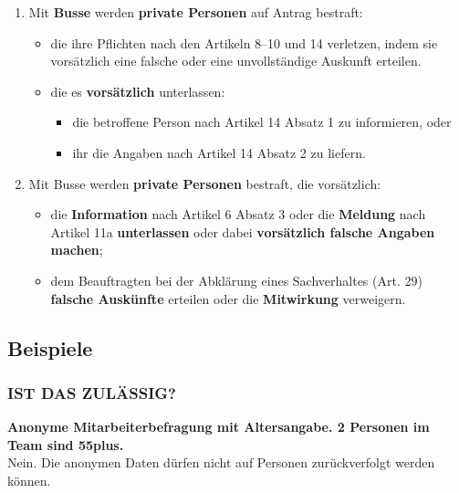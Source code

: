 \begin{enumerate}
\def\labelenumi{\arabic{enumi}.}
\tightlist
\item
  Mit \textbf{Busse} werden \textbf{private Personen} auf Antrag
  bestraft:

  \begin{itemize}
  \tightlist
  \item
    die ihre Pflichten nach den Artikeln 8--10 und 14 verletzen, indem
    sie vorsätzlich eine falsche oder eine unvollständige Auskunft
    erteilen.
  \item
    die es \textbf{vorsätzlich} unterlassen:

    \begin{itemize}
    \tightlist
    \item
      die betroffene Person nach Artikel 14 Absatz 1 zu informieren,
      oder
    \item
      ihr die Angaben nach Artikel 14 Absatz 2 zu liefern.
    \end{itemize}
  \end{itemize}
\item
  Mit Busse werden \textbf{private Personen} bestraft, die vorsätzlich:

  \begin{itemize}
  \tightlist
  \item
    die \textbf{Information} nach Artikel 6 Absatz 3 oder die
    \textbf{Meldung} nach Artikel 11a \textbf{unterlassen} oder dabei
    \textbf{vorsätzlich falsche Angaben machen};
  \item
    dem Beauftragten bei der Abklärung eines Sachverhaltes (Art. 29)
    \textbf{falsche Auskünfte} erteilen oder die \textbf{Mitwirkung}
    verweigern.
  \end{itemize}
\end{enumerate}

\hypertarget{beispiele}{%
\subsection{Beispiele}\label{beispiele}}

\hypertarget{ist-das-zuluxe4ssig}{%
\subsubsection{IST DAS ZULÄSSIG?}\label{ist-das-zuluxe4ssig}}

\textbf{Anonyme Mitarbeiterbefragung mit Altersangabe. 2 Personen im
Team sind 55plus.}\\
Nein. Die anonymen Daten dürfen nicht auf Personen zurückverfolgt werden
können.

